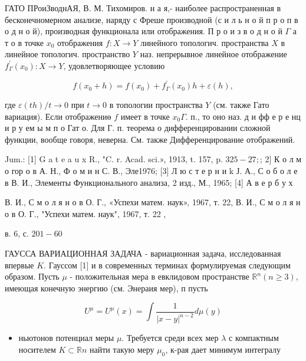 \documentclass[10pt]{article}
\begin{document}
ГАТО ПРоиЗводнАЯ, В. М. Тихомиров. н а я,- наиболее распространенная в бесконечномерном анализе, наряду с Фреше производной (с и л ь н о й п р о п в о д н о й), производная функционала или отображения. П р о и з в о д н о й $\Gamma$ а т о в точке $x_{0}$ отображения $f: X \rightarrow Y$ линейного топологич. пространства $X$ в линейное топологич. пространство $Y$ наз. непрерывное линейное отображение $f_{\Gamma}^{\prime}\left(x_{0}\right): X \rightarrow Y$, удовлетворяющее условию



\[

f\left(x_{0}+h\right)=f\left(x_{0}\right)+f_{\Gamma}^{\prime}\left(x_{0}\right) h+\varepsilon(h),

\]



где $\varepsilon(t h) / t \rightarrow 0$ при $t \rightarrow 0$ в топологии пространства $Y$ (см. также Гато вариация). Если отображениө $f$ имеет в точке $x_{0} \Gamma$. п., то оно наз. д и фф е р е нц и р у ем ы м п о Гат о. Для Г. п. теорема о дифференцировании сложной функции, вообще говоря, неверна. См. также Дифференцирование отображений.



Jum.: [1] G a t e a u x R., "C. r. Acad. sci.», 1913, t. 157, p. $325-27 ;$; 2$]$ К о л м о гор о в А. Н., Ф о м и н С. В., Эле1976; [3] Л ю с т е р н и $\mathrm{k}$ Ј. А., С о б о л е в В. И., Элементы Функционального анализа, 2 изд., М., 1965; [4] А в е р б у х

В. И., С м о л я н о в О. Г., «Успехи матем. наук», 1967, т. 22, В. И., С м о л я н о в О. Г., "Успехи матем. наук", 1967, т. 22 ,

в. 6, с. $201-60$



ГАУССА ВАРИАЦИОННАЯ ЗАДАЧА - вариационная задача, исследованная впервые $K$. Гауссом [1] и в современных терминах формулируемая следующим образом. Пусть $\mu$ - положительная мера в евклидовом пространстве $\mathbb{R}^{n}(n \geqslant 3)$, имеющая конечную энергию (см. Энераия мер), п пусть



\[

U^{\mu}=U^{\mu}(x)=\int \frac{1}{|x-y|^{n-2}} d \mu(y)

\]



\begin{itemize}

  \item ньютонов потенциал меры $\mu$. Требуется среди всех мер $\lambda$ с компактным носителем $K \subset \mathbb{R} n$ найти такую меру $\mu_{0}$, к-рая дает минимум интегралу

\end{itemize}
\end{document}
